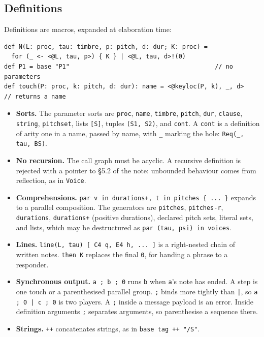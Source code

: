 \documentclass[11pt,a4paper]{article}
\newcommand{\ttx}[1]{\texttt{#1}}
\begin{document}
\subsection{Definitions}

Definitions are macros, expanded at elaboration time:
\begin{lstlisting}[language=score]
def N(L: proc, tau: timbre, p: pitch, d: dur; K: proc) =
  for (_ <- <@L, tau, p>) { K } | <@L, tau, d>!(0)
def P1 = base "P1"                                        // no parameters
def touch(P: proc, k: pitch, d: dur): name = <@keyloc(P, k), _, d>   // returns a name
\end{lstlisting}

\begin{itemize}
\item \textbf{Sorts.} The parameter sorts are \ttx{proc}, \ttx{name},
  \ttx{timbre}, \ttx{pitch}, \ttx{dur}, \ttx{clause}, \ttx{string},
  \ttx{pitchset}, lists \ttx{[S]}, tuples \ttx{(S1, S2)}, and \ttx{cont}.
  A \ttx{cont} is a definition of arity one in a name, passed by name, with
  \ttx{\_} marking the hole: \ttx{Req(\_, tau, BS)}.
\item \textbf{No recursion.} The call graph must be acyclic. A recursive
  definition is rejected with a pointer to \S5.2 of the note: unbounded
  behaviour comes from reflection, as in \ttx{Voice}.
\item \textbf{Comprehensions.} \ttx{par v in durations+, t in pitches \{ ...
  \}} expands to a parallel composition. The generators are \ttx{pitches},
  \ttx{pitches-r}, \ttx{durations}, \ttx{durations+} (positive durations),
  declared pitch sets, literal sets, and lists, which may be destructured as
  \ttx{par (tau, psi) in voices}.
\item \textbf{Lines.} \ttx{line(L, tau) [ C4 q, E4 h, ... ]} is a
  right-nested chain of written notes. \ttx{then K} replaces the final
  \ttx{0}, for handing a phrase to a responder.
\item \textbf{Synchronous output.} \ttx{a ; b ; 0} runs \ttx{b} when
  \ttx{a}'s note has ended. A step is one touch or a parenthesised parallel
  group. \ttx{;} binds more tightly than \ttx{|}, so \ttx{a ; 0 | c ; 0} is two
  players. A \ttx{;} inside a message payload is an error. Inside definition
  arguments \ttx{;} separates arguments, so parenthesise a sequence there.
\item \textbf{Strings.} \ttx{++} concatenates strings, as in
  \ttx{base tag ++ "/S"}.
\end{itemize}
\end{document}
